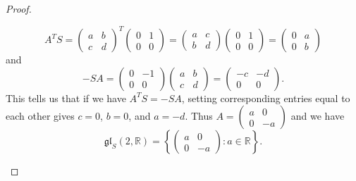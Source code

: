 \documentclass[12pt]{article}
\newcommand{\gl}{\mathfrak{gl}}
\theoremstyle{definition}
\begin{document}
\begin{proof}
\begin{enumerate}[label=(\alph*)]
\begin{equation*}
			      A^TS = \begin{pmatrix}a & b \\ c & d\end{pmatrix}^T \begin{pmatrix}0 & 1 \\ 0 & 0\end{pmatrix} = \begin{pmatrix}a & c \\ b & d\end{pmatrix} \begin{pmatrix}0 & 1 \\ 0 & 0\end{pmatrix} = \begin{pmatrix}0 & a \\ 0 & b\end{pmatrix}
		      \end{equation*}
		      and \begin{equation*}
			      -SA = \begin{pmatrix}0 & -1 \\ 0 & 0\end{pmatrix}\begin{pmatrix}a & b \\ c & d\end{pmatrix} = \begin{pmatrix}-c & -d \\ 0 & 0\end{pmatrix}.
		      \end{equation*}
		      This tells us that if we have $A^TS = -SA$, setting corresponding entries equal to each other gives $c = 0$, $b = 0$, and $a = -d$.
		      Thus $A = \begin{pmatrix}a & 0 \\ 0 & -a\end{pmatrix}$ and we have \begin{equation*}
			      \gl_S(2, \mathbb{R}) = \left\lbrace \begin{pmatrix}a & 0 \\ 0 & -a \end{pmatrix} : a \in \mathbb{R} \right\rbrace.
		      \end{equation*}
	\end{enumerate}
\end{proof}
\end{document}
